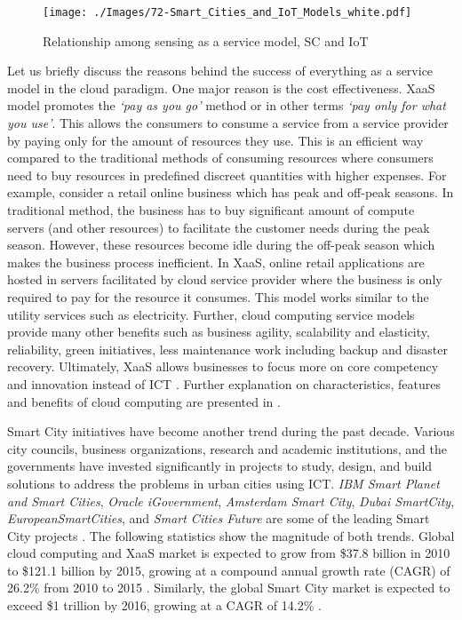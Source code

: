 \documentclass[times]{ettauth}
\begin{document}
\begin{figure*}[t]
 \centering
 \texttt{[image: ./Images/72-Smart\_Cities\_and\_IoT\_Models\_white.pdf]}
\caption{Relationship among sensing as a service model, SC and IoT}
 \label{Figure:Smart_Cities_and_IoT_Models}	
\vspace{-0.20cm}	
\end{figure*}


Let us briefly discuss the reasons behind the success of everything as a service model in the cloud paradigm. One major reason is the cost effectiveness. XaaS model promotes the \textit{`pay as you go'} method or in other terms \textit{`pay only for what you use'}.  This allows the consumers to consume a service from a service provider by paying only for the amount of resources they use. This is an efficient way compared to the traditional methods of consuming resources where consumers need to buy resources in predefined discreet quantities with higher expenses. For example, consider a retail online business which has peak and off-peak seasons. In traditional method, the business has to buy significant amount of compute servers (and other resources) to facilitate the customer needs during the peak season. However, these resources become idle during the off-peak season which makes the business process inefficient. In XaaS, online retail applications are hosted in servers facilitated by cloud service provider where the business is only required to pay for the resource it consumes. This model works similar to the utility services such as electricity. Further, cloud computing service models provide many other benefits such as business agility, scalability and elasticity, reliability, green initiatives, less maintenance work including backup and disaster recovery. Ultimately, XaaS allows businesses to focus more on core competency and innovation instead of ICT \cite{P539}. Further explanation on characteristics, features and benefits of cloud computing are presented in \cite{P498,P501}.





Smart City initiatives have become another trend during the past decade. Various city councils, business organizations, research and academic institutions, and the governments have invested significantly in projects to study, design, and build solutions to address the problems in urban cities using ICT. \textit{IBM Smart Planet and Smart Cities}, \textit{Oracle iGovernment},\textit{ Amsterdam Smart City}, \textit{Dubai SmartCity}, \textit{EuropeanSmartCities}, and\textit{ Smart Cities Future} are some of the leading Smart City projects \cite{P537, P536}. The following statistics show the magnitude of both trends. Global cloud computing and XaaS market is expected to grow from \$37.8 billion in 2010 to \$121.1 billion by 2015, growing at a compound annual growth rate (CAGR) of 26.2\% from 2010 to 2015 \cite{P539}. Similarly, the global Smart City market is expected to exceed \$1 trillion by 2016, growing at a CAGR of 14.2\% \cite{P358}. 
\end{document}
